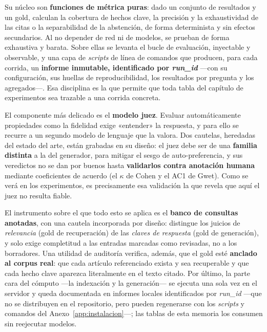 Su núcleo son \textbf{funciones de métrica puras}: dado un conjunto de resultados y un gold, calculan la cobertura de hechos clave, la precisión y la exhaustividad de las citas o la separabilidad de la abstención, de forma determinista y sin efectos secundarios. Al no depender de red ni de modelos, se prueban de forma exhaustiva y barata. Sobre ellas se levanta el bucle de evaluación, inyectable y observable, y una capa de \emph{scripts} de línea de comandos que producen, para cada corrida, un \textbf{informe inmutable, identificado por \emph{run\_id}} —con su configuración, sus huellas de reproducibilidad, los resultados por pregunta y los agregados—. Esa disciplina es la que permite que toda tabla del capítulo de experimentos sea trazable a una corrida concreta.

El componente más delicado es el \textbf{modelo juez}. Evaluar automáticamente propiedades como la fidelidad exige «entender» la respuesta, y para ello se recurre a un segundo modelo de lenguaje que la valora. Dos cautelas, heredadas del estado del arte, están grabadas en su diseño: el juez debe ser de una \textbf{familia distinta} a la del generador, para mitigar el sesgo de auto-preferencia, y sus veredictos no se dan por buenos hasta \textbf{validarlos contra anotación humana} mediante coeficientes de acuerdo (el $\kappa$ de Cohen y el AC1 de Gwet). Como se verá en los experimentos, es precisamente esa validación la que revela que aquí el juez no resulta fiable.

El instrumento sobre el que todo esto se aplica es el \textbf{banco de consultas anotadas}, con una cautela incorporada por diseño: distingue los juicios de \emph{relevancia} (gold de recuperación) de las \emph{claves de respuesta} (gold de generación), y solo exige completitud a las entradas marcadas como revisadas, no a los borradores. Una utilidad de auditoría verifica, además, que el gold esté \textbf{anclado al corpus real}: que cada artículo referenciado exista y sea recuperable y que cada hecho clave aparezca literalmente en el texto citado. Por último, la parte cara del cómputo —la indexación y la generación— se ejecuta una sola vez en el servidor y queda documentada en informes locales identificados por \emph{run\_id} —que no se distribuyen en el repositorio, pero pueden regenerarse con los \emph{scripts} y comandos del Anexo~\ref{app:instalacion}—; las tablas de esta memoria los consumen sin reejecutar modelos.
